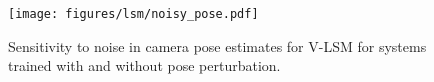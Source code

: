 \begin{figure}
\centering
\texttt{[image: figures/lsm/noisy\_pose.pdf]}
\caption{Sensitivity to noise in camera pose estimates for V-LSM for systems trained with and without pose perturbation.}
\end{figure}
